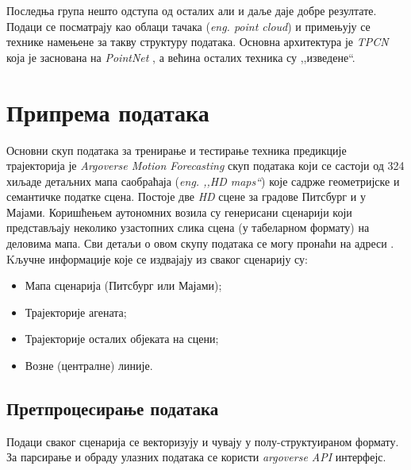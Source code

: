 \documentclass[11pt,oneside]{memoir}
\begin{document}
Последња група нешто одступа од осталих али и даље даје добре резултате. Подаци се посматрају као облаци тачака (\textit{eng. point cloud}) 
и примењују се технике намењене за такву структуру података. Основна
архитектура је \textit{TPCN} \cite{tpcn} која је заснована на \textit{PointNet} \cite{pointnet}, а већина осталих техника су ,,изведене``.

\chapter{Припрема података}

Основни скуп података за тренирање и тестирање техника предикције трајекторија је \textit{Argoverse Motion Forecasting} скуп података
који се састоји од 324 хиљаде детаљних мапа саобраћаја (\textit{eng. ,,HD maps``}) које садрже геометријске и семантичке податке сцена. Постоје две \textit{HD} сцене
за градове Питсбург и у Мајами. Коришћењем аутономних возила су генерисани сценарији који представљају неколико узастопних слика сцена (у табеларном формату)
на деловима мапа. Сви детаљи о овом скупу података се могу пронаћи на адреси 
\href{https://www.argoverse.org/index.html}{\color{blue}{www.argoverse.org}} \cite{argoverse}. \\


\noindent Kључне информације које се издвајају из сваког сценарију су:
\begin{itemize}
  \item Мапа сценарија (Питсбург или Мајами);
  \item Трајекторије агената;
  \item Трајекторије осталих објеката на сцени;
  \item Возне (централне) линије.
\end{itemize}

\section{Претпроцесирање података}

\noindent Подаци сваког сценарија се векторизују и чувају у полу-структуираном формату. 
За парсирање и обраду улазних података се користи \textit{argoverse API} интерфејс.
\end{document}
